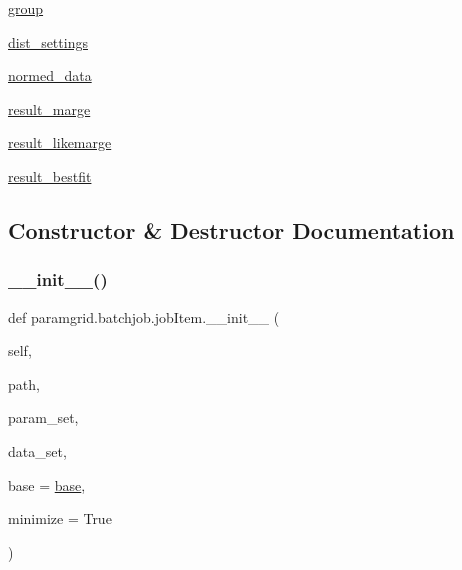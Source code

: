 \begin{DoxyCompactItemize}
\item 
\mbox{\hyperlink{classparamgrid_1_1batchjob_1_1jobItem_ad358d2c3490fb199a8e78d6db1cca231}{group}}
\item 
\mbox{\hyperlink{classparamgrid_1_1batchjob_1_1jobItem_ae9baf10cbbb465071088217828f44f8a}{dist\+\_\+settings}}
\item 
\mbox{\hyperlink{classparamgrid_1_1batchjob_1_1jobItem_ade514f416b6adf933c41be446fc07f79}{normed\+\_\+data}}
\item 
\mbox{\hyperlink{classparamgrid_1_1batchjob_1_1jobItem_abc7c44a92cd7a984e0fdfe2b6392baad}{result\+\_\+marge}}
\item 
\mbox{\hyperlink{classparamgrid_1_1batchjob_1_1jobItem_a69f5874763ee7aa338e7d676a2f25ff5}{result\+\_\+likemarge}}
\item 
\mbox{\hyperlink{classparamgrid_1_1batchjob_1_1jobItem_a17347db750dc65e2351f9cda31950126}{result\+\_\+bestfit}}
\end{DoxyCompactItemize}


\subsection{Constructor \& Destructor Documentation}
\mbox{\label{classparamgrid_1_1batchjob_1_1jobItem_ac0d59c15a23577cc2d2ae0e691dc780f}} 
\subsubsection{\texorpdfstring{\+\_\+\+\_\+init\+\_\+\+\_\+()}{\_\_init\_\_()}}
{\footnotesize\ttfamily def paramgrid.\+batchjob.\+job\+Item.\+\_\+\+\_\+init\+\_\+\+\_\+ (\begin{DoxyParamCaption}\item[{}]{self,  }\item[{}]{path,  }\item[{}]{param\+\_\+set,  }\item[{}]{data\+\_\+set,  }\item[{}]{base = {\ttfamily \textquotesingle{}\mbox{\hyperlink{classparamgrid_1_1batchjob_1_1jobItem_af453f4de88c699dffaaca5bbff071035}{base}}\textquotesingle{}},  }\item[{}]{minimize = {\ttfamily True} }\end{DoxyParamCaption})}



